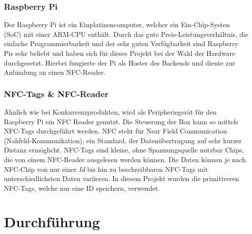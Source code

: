 \documentclass[10pt, a4paper]{article}
\begin{document}
\begin{onehalfspace}
  \subsubsection*{Raspberry Pi}
    Der Raspberry Pi ist ein Einplatinencomputer, welcher ein Ein-Chip-Systen (SoC) mit einer ARM-CPU enthält.
    Durch das gute Preis-Leistungsverhältnis, die einfache Programmierbarkeit und der sehr guten Verfügbarkeit sind Raspberry Pis sehr beliebt und haben sich für dieses Projekt bei der Wahl der Hardware durchgesetzt.
    Hierbei fungierte der Pi als Hoster des Backends und diente zur Anbindung an einen NFC-Reader.

  \subsubsection*{NFC-Tags \& NFC-Reader}
    Ähnlich wie bei Konkurrenzprodukten, wird als Peripheriegerät für den Raspberry Pi ein NFC Reader genutzt.
    Die Steuerung der Box kann so mittels NFC-Tags durchgeführt werden.
    NFC steht für \glqq Near Field Communication\grqq{} (Nahfeld-Kommunikation), ein Standard, der
    Datenübertragung auf sehr kurzer Distanz ermöglicht.
    NFC-Tags sind kleine, ohne Spannungsquelle nutzbar Chips, die von einem NFC-Reader ausgelesen werden können. Die Daten können je nach
    NFC-Chip von nur einer \textit{Id} bis hin zu beschreibbaren NFC-Tags mit unterschiedlichsten Daten
    variieren. In diesem Projekt wurden die primitiveren NFC-Tags, welche nur eine ID speichern, verwendet.

\section{Durchführung}

\end{onehalfspace}
\end{document}
